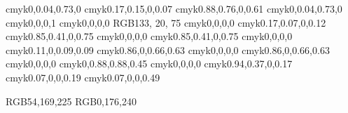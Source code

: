 \definecolor{thmtitle@color}				{cmyk}{0,0.04,0.73,0}
\definecolor{ex@bg@color}				{cmyk}{0.17,0.15,0,0.07}
\definecolor{extitle@bg@color}			{cmyk}{0.88,0.76,0,0.61}
\definecolor{extitle@color}				{cmyk}{0,0.04,0.73,0}
\definecolor{dem@border@color}			{cmyk}{0,0,0,1}
\definecolor{dem@bg@color}				{cmyk}{0,0,0,0}
\definecolor{activitytitle@color}		{RGB}{133, 20, 75}
\definecolor{activitynum@color}		 	{cmyk}{0,0,0,0}
\definecolor{exercices@bg@color}		 	{cmyk}{0.17,0.07,0,0.12}
\definecolor{exercicetitle@bg@color}		{cmyk}{0.85,0.41,0,0.75}
\definecolor{exercicetitle@color}		{cmyk}{0,0,0,0}
\definecolor{exercicenum@bg@color}		{cmyk}{0.85,0.41,0,0.75}
\definecolor{exercicenum@color}			{cmyk}{0,0,0,0}
\definecolor{corriges@bg@color}		 	{cmyk}{0.11,0,0.09,0.09}
\definecolor{corrigetitle@bg@color}		{cmyk}{0.86,0,0.66,0.63}
\definecolor{corrigetitle@color}			{cmyk}{0,0,0,0}
\definecolor{corrigenum@bg@color}		{cmyk}{0.86,0,0.66,0.63}
\definecolor{corrigenum@color}			{cmyk}{0,0,0,0}
\definecolor{corref@color}				{cmyk}{0,0.88,0.88,0.45}
\definecolor{indextitle@color}			{cmyk}{0,0,0,0}
\definecolor{indextitle@bg@color}		{cmyk}{0.94,0.37,0,0.17}
\definecolor{contentstitle@color}		{cmyk}{0.07,0,0,0.19}
\definecolor{contentstitleshadow@color}	{cmyk}{0.07,0,0,0.49}


\newcommand{\redefineColor}[2]{\definecolor{#1}{cmyk}{#2}}
\newcommand{\firstline}{\rowcolor{cell@color}}



\definecolor{easi@default@blue} {RGB}{54,169,225}
\definecolor{easi@light@blue} {RGB}{0,176,240}
